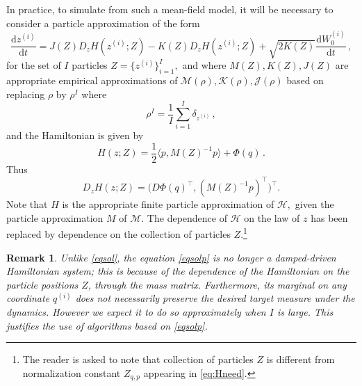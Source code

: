 \documentclass[12pt]{caltech_thesis}
\newtheorem{remark}[theorem]{Remark}
\numberwithin{equation}{section}
\begin{document}
{In practice, to simulate from such a mean-field model, it will
be necessary to consider a particle approximation of the form
\begin{equation}
\label{eqsolp}
\frac{\mathrm{d} z^{(i)}}{\mathrm{d} t}={J(Z) D_{z} H(z^{(i)};Z)-K(Z) D_{z} H(z^{(i)};Z)}+\sqrt{2 K(Z)} \frac{\mathrm{d} W_0^{(i)}}{\mathrm{d} t}\,,
\end{equation}
for the set of $I$ particles $Z=\{ z^{(i)} \}_{i=1}^I,$ and where {$M(Z), K(Z), J(Z)$ are
appropriate empirical approximations of $\mathcal{M}(\rho), \mathcal{K}(\rho), \mathcal{J}(\rho)$ based on replacing $\rho$ by $\rho^I$ where}
$$\rho^I = {\frac{1}{I}}\sum_{i=1}^{I} \delta_{z^{(i)}}\,,$$}
and the Hamiltonian is given by
\begin{equation}
\label{eq:surelyneed}
H(z;Z)=\frac{1}{2}\langle p,M(Z)^{-1}p\rangle+\Phi(q)\,.
\end{equation} 
Thus
$$D_z H(z;Z)=\bigl(D\Phi(q)^\top, (M(Z)^{-1}p)^\top\bigr)^\top.$$
{Note that $H$ is the appropriate finite particle approximation of
$\mathcal{H},$ given the particle approximation $M$ of $\mathcal{M}.$ The 
dependence of $\mathcal{H}$ on the law of $z$ has been replaced by
dependence on the collection of particles $Z$.\footnote{The reader is asked
to note that collection of particles $Z$ is different from normalization
constant $Z_{q,p}$ appearing in \eqref{eq:Hneed}.}}

\vspace{0.1in}

\begin{remark}
\label{rem:12}
{Unlike \eqref{eqsol}, the equation \eqref{eqsolp} is no longer 
a damped-driven Hamiltonian system; this is because of the dependence
of the Hamiltonian on the particle positions $Z$, through the mass
matrix. Furthermore, its marginal on any 
coordinate $q^{(i)}$ does not necessarily
preserve the desired target measure under the dynamics. However we
expect it to do so \emph{approximately} when $I$ is large. This
justifies the use of algorithms based on \eqref{eqsolp}.}
\end{remark}

\vspace{0.1in}
\end{document}
